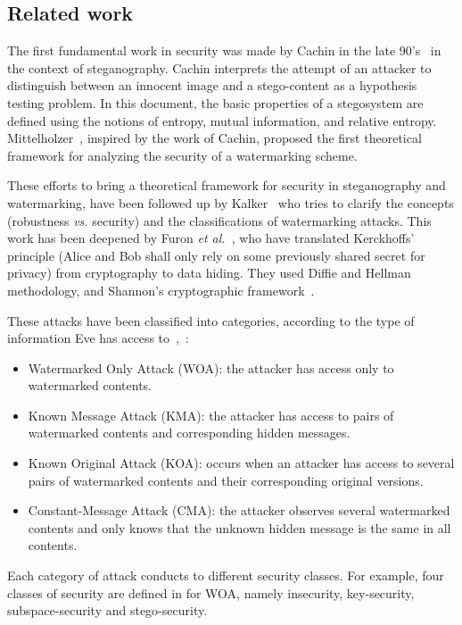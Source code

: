 \documentclass{llncs}
\begin{document}
\subsection{Related work}
\label{raleted}


The first fundamental work in security was made by Cachin in the late 90's~\cite{Cachin2004} in the context of steganography. Cachin interprets the attempt of an attacker to distinguish between an innocent image and a stego-content as a hypothesis testing problem. In this document, the basic properties of a stegosystem are defined using the notions of entropy, mutual information, and relative entropy. Mittelholzer~\cite{Mittelholzer99}, inspired by the work of Cachin, proposed the first theoretical framework for analyzing the security of a watermarking scheme.


These efforts to bring a theoretical framework for security in steganography and watermarking, have been followed up by Kalker~\cite{Kalker2001} who tries to clarify the concepts (robustness \emph{vs.} security) and the classifications of watermarking attacks. This work has been deepened by Furon \emph{et al.}~\cite{Furon2002}, who have translated Kerckhoffs' principle (Alice and Bob shall only rely on some previously shared secret for privacy) from cryptography to data hiding. They used Diffie and Hellman methodology, and Shannon's cryptographic framework~\cite{Shannon49}.



These attacks have been classified into categories, according to the type of information Eve has access to~\cite{Cayre2005},~\cite{Perez06}:
\begin{itemize}
\item Watermarked Only Attack (WOA): the attacker has access only to watermarked contents.
\item Known Message Attack (KMA): the attacker has access to pairs of watermarked contents and corresponding hidden messages.
\item Known Original Attack (KOA): occurs when an attacker has access to several pairs of watermarked contents and their corresponding original versions.
\item Constant-Message Attack (CMA): the attacker observes several watermarked contents and only knows that the unknown hidden message is the same in all contents.
\end{itemize}

Each category of attack conducts to different security classes. For example, four classes of security are defined in \cite{Cayre2008} for WOA, namely insecurity, key-security, subspace-security and stego-security.
\end{document}
